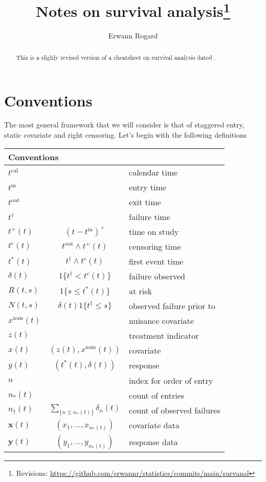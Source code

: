 \documentclass{article}
\title{Notes on survival analysis\footnote{Revisions: \url{https://github.com/erwannr/statistics/commits/main/survanal}}}
\author{Erwann Rogard}
\date{\ThisDate}
\newcommand{\tcal}{t^{\mathrm{cal}}}
\newcommand{\tcaldef}{calendar time}
\newcommand{\tobsdef}{observation time}
\newcommand{\tfail}{t^{\dag}}
\newcommand{\tfaildef}{failure time}
\newcommand{\tentry}{t^{\mathrm{in}}}
\newcommand{\tentrydef}{entry time}
\newcommand{\texit}{t^{\mathrm{out}}}
\newcommand{\texitdef}{exit time}
\newcommand{\tonstudy}{t^{+}}
\newcommand{\tonstudydef}{time on study}
\newcommand{\tonstudyformula}[1]{(#1-\tentry)^{+}}
\newcommand{\tcens}{t^{\mathrm{c}}}
\newcommand{\tcensdef}{censoring time}
\newcommand{\tcensformula}[1]{\texit \wedge \tonstudy(#1)}
\newcommand{\tobs}{t^{\mathrm{obs}}}
\newcommand{\tmin}{t^{*}}
\newcommand{\tmindef}{first event time}
\newcommand{\tminformula}[1]{\tfail \wedge \tcens(#1)}
\newcommand{\isfail}{\delta}
\newcommand{\isfaildef}{failure observed}
\newcommand{\isfailformula}[1]{1\{\tfail<\tcens(#1)\}}
\newcommand{\atrisk}{R}
\newcommand{\atriskdef}{at risk}
\newcommand{\atriskformula}[2]{1\{#2\leq\tmin(#1)\}}
\newcommand{\unitcount}{N}
\newcommand{\unitcountdef}{observed failure prior to}
\newcommand{\unitcountformula}[2]{\isfail(#1)1\{\tfail\leq #2\}}
\newcommand{\survresp}{y}
\newcommand{\survrespdef}{response}
\newcommand{\survrespformula}[1]{(\tmin(#1),\isfail(#1))}
\newcommand{\survnuiscov}{x^{\mathrm{nuis}}}
\newcommand{\survnuiscovdef}{nuisance covariate}
\newcommand{\survfullcov}{x}
\newcommand{\survfullcovdef}{covariate}
\newcommand{\survfullcovformula}[1]{(\treatindic(#1),\survnuiscov(#1))}
\newcommand{\nentry}{n}
\newcommand{\nentrydef}{index for order of entry}
\newcommand{\nentries}{n_*}
\newcommand{\nentriesdef}{count of entries}
\newcommand{\nfailed}{n_{\dag}}
\newcommand{\nfaileddef}{count of observed failures}
\newcommand{\nfailedformula}[1]{\sum_{\{n\leq \nentries(#1)\}} \isfail_n(#1)}
\newcommand{\survcovmat}{\mathbf{x}}
\newcommand{\survcovmatdef}{covariate data}
\newcommand{\survcovmatformula}[1]{(\survfullcov_1,...,\survfullcov_{\nentries(#1)})}
\newcommand{\survrespmat}{\mathbf{y}}
\newcommand{\survrespmatdef}{response data}
\newcommand{\survrespmatformula}[1]{(\survresp_1,...,\survresp_{\nentries(#1)})}
\newcommand{\treatindic}{z}
\newcommand{\treatindicdef}{treatment indicator}
\begin{document}
\maketitle

\begin{abstract}This is a slighly revised version of a cheatsheet on survival analysis dated .\end{abstract}

\section{Conventions}
The most general framework that we will consider is that of staggered entry, static covariate and right censoring.  Let's begin with the following definitions
\begin{center}
\begin{tabular}{|l|c|l|}\hline
\multicolumn{3}{|l|}{Conventions}\\\hline
$\tcal$ & &\tcaldef \\
\hline
$\tentry$ & &\tentrydef\\
$\texit$ & &\texitdef\\
$\tfail$ & &\tfaildef\\
$\tonstudy(t)$ &  $\tonstudyformula{t}$ & \tonstudydef\\
$\tcens(t)$ & $\tcensformula{t}$ & \tcensdef  \\
$\tmin(t)$ & $\tminformula{t}$ & \tmindef\\
$\isfail(t)$ & $\isfailformula{t}$ &\isfaildef \\
$\atrisk(t,s)$ & $\atriskformula{t}{s}$ &\atriskdef\\
$\unitcount(t,s)$ & $\unitcountformula{t}{s}$ & \unitcountdef\\
$\survnuiscov(t)$ &  & \survnuiscovdef\\
$\treatindic(t)$ & & \treatindicdef\\
$\survfullcov(t)$ & $\survfullcovformula{t}$ & \survfullcovdef\\
$\survresp(t)$ & $\survrespformula{t}$ & \survrespdef\\
\hline
$\nentry$ &  &\nentrydef\\
$\nentries(t)$ &  & \nentriesdef\\
$\nfailed(t)$ & $\nfailedformula{t}$ &\nfaileddef\\
$\survcovmat(t)$ & $\survcovmatformula{t}$ & \survcovmatdef\\
$\survrespmat(t)$ & $\survrespmatformula{t}$ & \survrespmatdef\\

\end{tabular}
\end{center}
\end{document}
